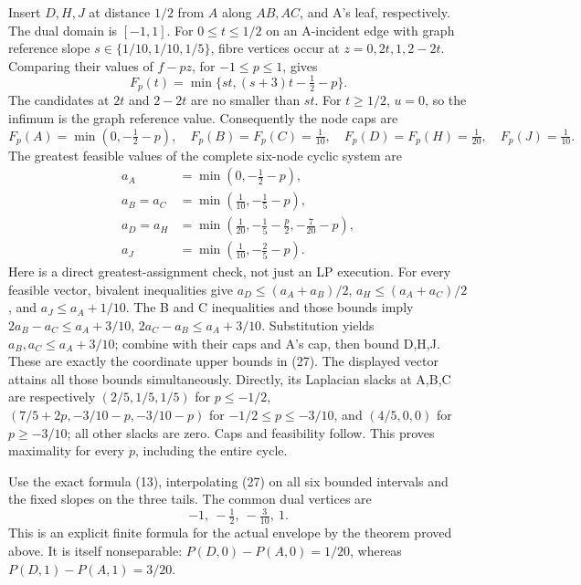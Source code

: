 \documentclass[
  11pt,
]{article}
\begin{document}
Insert \(D,H,J\) at distance \(1/2\) from \(A\) along \(AB,AC\), and A's
leaf, respectively. The dual domain is \([-1,1]\). For
\(0\leq t\leq1/2\) on an A-incident edge with graph reference slope
\(s\in\{1/10,1/10,1/5\}\), fibre vertices occur at \(z=0,2t,1,2-2t\).
Comparing their values of \(f-pz\), for \(-1\leq p\leq1\), gives \[
 F_p(t)=\min\{st,(s+3)t-\tfrac12-p\}.
\] The candidates at \(2t\) and \(2-2t\) are no smaller than \(st\). For
\(t\geq1/2\), \(u=0\), so the infimum is the graph reference value.
Consequently the node caps are \[
 F_p(A)=\min(0,-\tfrac12-p),\quad F_p(B)=F_p(C)=\tfrac1{10},\quad
 F_p(D)=F_p(H)=\tfrac1{20},\quad F_p(J)=\tfrac1{10}.
\] The greatest feasible values of the complete six-node cyclic system
are \[
\begin{split}
 a_A&=\min(0,-\tfrac12-p),\\
 a_B=a_C&=\min(\tfrac1{10},-\tfrac15-p),\\
 a_D=a_H&=\min(\tfrac1{20},-\tfrac15-\tfrac p2,-\tfrac7{20}-p),\\
 a_J&=\min(\tfrac1{10},-\tfrac25-p).
\end{split}                                                       \tag{27}
\] Here is a direct greatest-assignment check, not just an LP execution.
For every feasible vector, bivalent inequalities give
\(a_D\leq(a_A+a_B)/2\), \(a_H\leq(a_A+a_C)/2\), and
\(a_J\leq a_A+1/10\). The B and C inequalities and those bounds imply
\(2a_B-a_C\leq a_A+3/10\), \(2a_C-a_B\leq a_A+3/10\). Substitution
yields \(a_B,a_C\leq a_A+3/10\); combine with their caps and A's cap,
then bound D,H,J. These are exactly the coordinate upper bounds in (27).
The displayed vector attains all those bounds simultaneously. Directly,
its Laplacian slacks at A,B,C are respectively \((2/5,1/5,1/5)\) for
\(p\leq-1/2\), \((7/5+2p,-3/10-p,-3/10-p)\) for \(-1/2\leq p\leq-3/10\),
and \((4/5,0,0)\) for \(p\geq-3/10\); all other slacks are zero. Caps
and feasibility follow. This proves maximality for every \(p\),
including the entire cycle.

Use the exact formula (13), interpolating (27) on all six bounded
intervals and the fixed slopes on the three tails. The common dual
vertices are \[
                         -1,\ -\tfrac12,\ -\tfrac3{10},\ 1.
\] This is an explicit finite formula for the actual envelope by the
theorem proved above. It is itself nonseparable: \(P(D,0)-P(A,0)=1/20\),
whereas \(P(D,1)-P(A,1)=3/20\).
\end{document}
